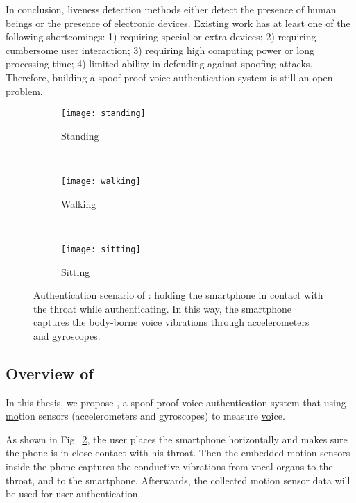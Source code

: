 In conclusion, liveness detection methods either detect the presence of human beings or the presence of electronic devices. Existing work has at least one of the following shortcomings: 1) requiring special or extra devices; 2) requiring cumbersome user interaction; 3) requiring high computing power or long processing time; 4) limited ability in defending against spoofing attacks. Therefore, building a spoof-proof voice authentication system is still an open problem.






\begin{figure}[!h]
	\centering
	\begin{subfigure}[b]{0.15\textwidth}
		\centering
		\texttt{[image: standing]}
		\caption{Standing}
	\end{subfigure}%
	~~~\qquad
	\begin{subfigure}[b]{0.15\textwidth}
		\centering
		\texttt{[image: walking]}
		\caption{Walking}
	\end{subfigure}
	~~~\qquad
	\begin{subfigure}[b]{0.15\textwidth}
		\centering
		\texttt{[image: sitting]}
		\caption{Sitting}\label{fig:usec}
	\end{subfigure}
	\caption[Authentication Scenario of {\shortname}]{Authentication scenario of {\shortname}: holding the smartphone in contact with the throat while authenticating. In this way, the smartphone captures the body-borne voice vibrations through accelerometers and gyroscopes.}
	\label{fig:use}
\end{figure}


\subsection{Overview of {\shortname}}

In this thesis, we propose {\shortname}, a spoof-proof voice authentication system that using \underline{mo}tion sensors (accelerometers and gyroscopes) to measure \underline{vo}ice.


As shown in Fig.~\ref{fig:use}, the user places the smartphone horizontally and makes sure the phone is in close contact with his throat. Then the embedded motion sensors inside the phone captures the conductive vibrations from vocal organs to the throat, and to the smartphone. Afterwards, the collected motion sensor data will be used for user authentication.


